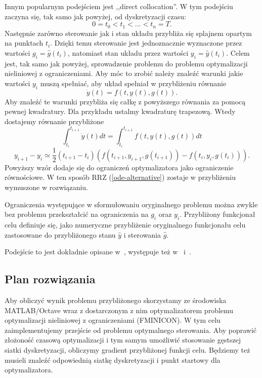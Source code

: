 \documentclass[11pt]{article}
\begin{document}
Innym popularnym podejściem jest ,,direct collocation''. W tym podejściu zaczyna się, tak samo jak powyżej, od dyskretyzacji czasu:
\begin{equation}
  0 = t_0 < t_1 < \ldots < t_n = T.
\end{equation}
Następnie zarówno sterowanie jak i stan układu przybliża się splajnem opartym na punktach $t_i$. Dzięki temu sterowanie jest jednoznacznie wyznaczone przez wartości $g_i = \hat{g}(t_i)$, natomiast stan układu przez wartości $y_i = \hat{y}(t_i)$. Celem jest, tak samo jak powyżej, sprowadzenie problemu do problemu optymalizacji nieliniowej z ograniczeniami. Aby móc to zrobić należy znaleźć warunki jakie wartości $y_i$ muszą spełniać, aby układ spełniał w przybliżeniu równanie
\begin{equation}\label{ode-alternative}
  \dot{y}(t) = f(t,y(t),g(t)).
\end{equation}
Aby znaleźć te warunki przybliża się całkę z powyższego równania za pomocą pewnej kwadratury. Dla przykładu ustalmy kwadraturę trapezową. Wtedy dostajemy równanie przybliżone
\begin{equation}
  \int_{t_i}^{t_{i+1}} \dot{y}(t)dt = \int_{t_i}^{t_{i+1}} f(t,y(t),g(t))dt
\end{equation}
\begin{equation}
  y_{i+1} - y_{i} \simeq \frac{1}{2}(t_{i+1}-t_i)(f(t_{i+1}, y_{i+1}, g(t_{i+1})) - f(t_i, y_i, g(t_i))).
\end{equation}
Powyższy wzór dodaje się do ograniczeń optymalizatora jako ograniczenie równościowe. W ten sposób RRZ (\ref{ode-alternative}) zostaje w przybliżeniu wymuszone w rozwiązaniu.

Ograniczenia występujące w sformułowaniu oryginalnego problemu można zwykle bez problemu przekształcić na ograniczenia na $g_i$ oraz $y_i$. Przybliżony funkcjonał celu definiuje się, jako numeryczne przybliżenie oryginalnego funkcjonału celu zastosowane do przybliżonego stanu $\hat{y}$ i sterowania $\hat{g}$.

Podejście to jest dokładnie opisane w~\cite{Kelly}, występuje też w~\cite{diehl} i~\cite{rao-methods}.

\subsection{Plan rozwiązania}
Aby obliczyć wynik problemu przybliżonego skorzystamy ze środowiska MATLAB/Octave wraz z dostarczonym z nim optymalizatorem problemu optymalizacji nieliniowej z ograniczeniami (FMINICON). W tym celu zaimplementujemy przejście od problemu optymalnego sterowania. Aby poprawić złożoność czasową optymalizacji i tym samym umożliwić stosowanie gęstszej siatki dyskretyzacji, obliczymy gradient przybliżonej funkcji celu. Będziemy też musieli znaleźć odpowiednią siatkę dyskretyzacji i punkt startowy dla optymalizatora.
\end{document}
